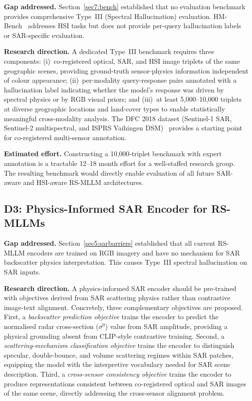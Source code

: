 \textbf{Gap addressed.} Section~\ref{sec7:bench} established that no
evaluation benchmark provides comprehensive Type~III (Spectral Hallucination)
evaluation. HM-Bench~\cite{hmbench2026} addresses HSI tasks but does not
provide per-query hallucination labels or SAR-specific evaluation.

\textbf{Research direction.} A dedicated Type~III benchmark requires three
components: (i)~co-registered optical, SAR, and HSI image triplets of the
same geographic scenes, providing ground-truth sensor-physics information
independent of colour appearance; (ii)~per-modality query-response pairs
annotated with a hallucination label indicating whether the model's
response was driven by spectral physics or by RGB visual priors; and
(iii)~at least 5,000--10,000 triplets at diverse geographic locations and
land-cover types to enable statistically meaningful cross-modality analysis.
The DFC 2018 dataset (Sentinel-1 SAR, Sentinel-2 multispectral, and ISPRS
Vaihingen DSM)~\cite{yokoya2018hyperspectral} provides a starting point
for co-registered multi-sensor annotation.

\textbf{Estimated effort.} Constructing a 10,000-triplet benchmark with
expert annotation is a tractable 12--18 month effort for a well-staffed
research group. The resulting benchmark would directly enable evaluation of
all future SAR-aware and HSI-aware RS-MLLM architectures.

\subsection{D3: Physics-Informed SAR Encoder for RS-MLLMs}\label{sec9:d3}

\textbf{Gap addressed.} Section~\ref{sec5:sarbarriers} established that all
current RS-MLLM encoders are trained on RGB imagery and have no mechanism
for SAR backscatter physics interpretation. This causes Type~III spectral
hallucination on SAR inputs.

\textbf{Research direction.} A physics-informed SAR encoder should be
pre-trained with objectives derived from SAR scattering physics rather than
contrastive image-text alignment. Concretely, three complementary objectives
are proposed. First, a \emph{backscatter prediction objective} trains the
encoder to predict the normalised radar cross-section ($\sigma^0$) value
from SAR amplitude, providing a physical grounding absent from CLIP-style
contrastive training. Second, a \emph{scattering-mechanism classification
objective} trains the encoder to distinguish specular, double-bounce, and
volume scattering regimes within SAR patches, equipping the model with
the interpretive vocabulary needed for SAR scene description. Third, a
\emph{cross-sensor consistency objective} trains the encoder to produce
representations consistent between co-registered optical and SAR images
of the same scene, directly addressing the cross-sensor alignment problem.

